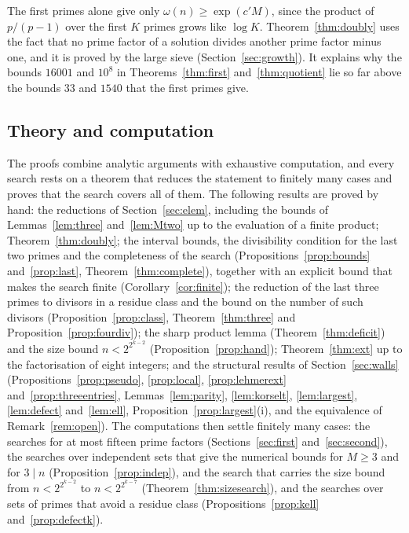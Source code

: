 \documentclass[11pt,reqno]{amsart}
\numberwithin{equation}{section}
\theoremstyle{plain}
\theoremstyle{definition}
\theoremstyle{remark}
\begin{document}
The first primes alone give only $\omega(n)\ge\exp(c'M)$, since the
product of $p/(p-1)$ over the first $K$ primes grows like $\log K$.
Theorem~\ref{thm:doubly} uses the fact that no prime factor of a
solution divides another prime factor minus one, and it is proved by
the large sieve (Section~\ref{sec:growth}). It explains why the bounds
$16001$ and $10^8$ in Theorems~\ref{thm:first} and~\ref{thm:quotient}
lie so far above the bounds $33$ and $1540$ that the first primes give.

\subsection{Theory and computation}
The proofs combine analytic arguments with exhaustive computation, and
every search rests on a theorem that reduces the statement to finitely
many cases and proves that the search covers all of them. The following
results are proved by hand: the reductions of Section~\ref{sec:elem},
including the bounds of Lemmas~\ref{lem:three} and~\ref{lem:Mtwo} up to
the evaluation of a finite product; Theorem~\ref{thm:doubly}; the interval bounds, the
divisibility condition for the last two primes and the completeness of
the search (Propositions~\ref{prop:bounds} and~\ref{prop:last},
Theorem~\ref{thm:complete}), together with an explicit bound that makes
the search finite (Corollary~\ref{cor:finite}); the reduction of the
last three primes to divisors in a residue class and the bound on the
number of such divisors (Proposition~\ref{prop:class},
Theorem~\ref{thm:three} and Proposition~\ref{prop:fourdiv}); the sharp
product lemma (Theorem~\ref{thm:deficit}) and the size bound
$n<2^{2^{k-2}}$ (Proposition~\ref{prop:hand}); Theorem~\ref{thm:ext}
up to the factorisation of eight integers; and the structural results
of Section~\ref{sec:walls} (Propositions~\ref{prop:pseudo},
\ref{prop:local}, \ref{prop:lehmerext} and~\ref{prop:threeentries},
Lemmas~\ref{lem:parity}, \ref{lem:korselt}, \ref{lem:largest},
\ref{lem:defect} and~\ref{lem:ell}, Proposition~\ref{prop:largest}(i),
and the equivalence of Remark~\ref{rem:open}). The computations then
settle finitely many cases: the searches for at most fifteen prime
factors (Sections~\ref{sec:first} and~\ref{sec:second}), the searches
over independent sets that give the numerical bounds for $M\ge3$ and for
$3\mid n$ (Proposition~\ref{prop:indep}), and the search that carries the size
bound from $n<2^{2^{k-2}}$ to $n<2^{2^{k-7}}$
(Theorem~\ref{thm:sizesearch}), and the searches over sets of primes
that avoid a residue class (Propositions~\ref{prop:kell}
and~\ref{prop:defectk}).
\end{document}
